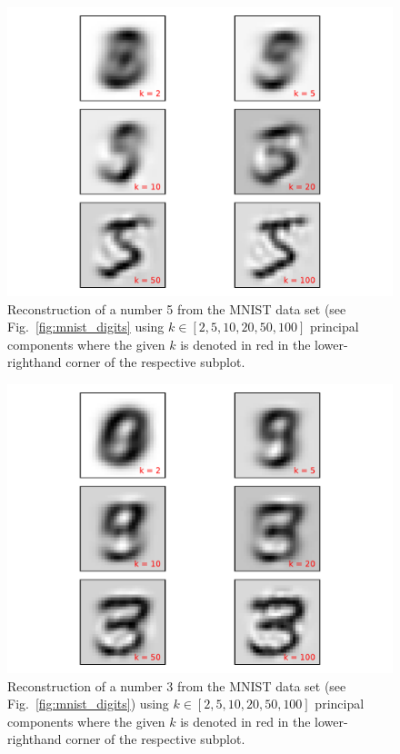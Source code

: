 \documentclass[12pt]{amsart}
\begin{document}
\begin{figure}[H]
	\includegraphics[width=\columnwidth]{5_recon_mnist.pdf}
    \caption{Reconstruction of a number 5 from the MNIST data set (see Fig.~\ref{fig:mnist_digits} using $k \in [2,5,10,20,50,100]$ principal components where the given $k$ is denoted in red in the lower-righthand corner of the respective subplot.}
    \label{fig:recon_5}
\end{figure}

\begin{figure}[H]
	\includegraphics[width=\columnwidth]{3_recon_mnist.pdf}
    \caption{Reconstruction of a number 3 from the MNIST data set (see Fig.~\ref{fig:mnist_digits}) using $k \in [2,5,10,20,50,100]$ principal components where the given $k$ is denoted in red in the lower-righthand corner of the respective subplot.}
    \label{fig:recon_3}
\end{figure}
\end{document}
